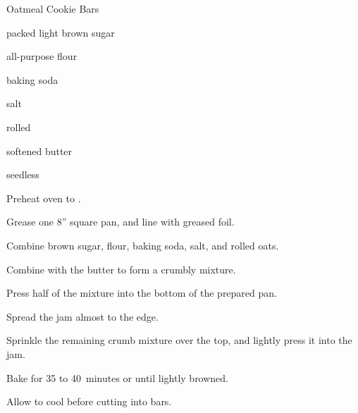 \begin{recipe}{Oatmeal Cookie Bars}{}{}

\begin{ingredients}
\item \C{\half} packed light brown sugar
\item {} all-purpose flour
\item \tp{\quarter} baking soda
\item \tp{\eighth} salt
\item {} rolled 
\item \C{\half} softened butter
\item \C{\threequarter} seedless  
\end{ingredients}

\begin{directions}
\item Preheat oven to .
\item Grease one 8'' square pan, and line with greased foil.
\item Combine brown sugar, flour, baking soda, salt, and rolled oats.
\item Combine with the butter to form a crumbly mixture.
\item Press half of the mixture into the bottom of the prepared pan.
\item Spread the jam almost to the edge.
\item Sprinkle the remaining crumb mixture over the top, and lightly press it into the jam.
\item Bake for 35 to 40~minutes or until lightly browned.
\item Allow to cool before cutting into bars.
\end{directions}
\end{recipe}

